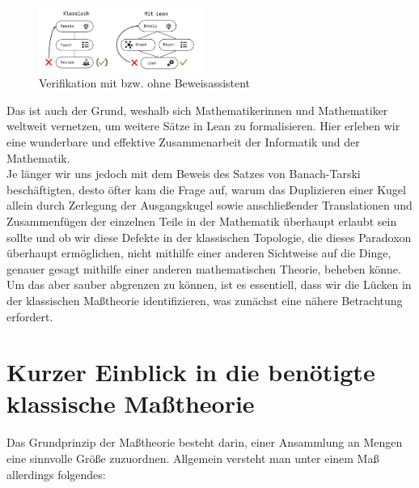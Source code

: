 \documentclass[hidelinks]{article}
\newcommand{\rot}[1]{\textcolor{red}{{#1}}}
\begin{document}
    \begin{figure}
        \begin{center}
            \includegraphics[width=0.48\textwidth]{Formalisierung_Grafik.png}
        \end{center}
        \caption{Verifikation mit bzw. ohne Beweisassistent}
        \label{Abb1}
    \end{figure}
    \noindent Das ist auch der Grund, weshalb sich Mathematikerinnen und Mathematiker weltweit vernetzen, um weitere Sätze in Lean zu formalisieren. Hier erleben wir eine wunderbare und effektive Zusammenarbeit der Informatik und der Mathematik. \\
    \noindent Je länger wir uns jedoch mit dem Beweis des Satzes von Banach-Tarski beschäftigten, desto öfter kam die Frage auf, warum das Duplizieren einer Kugel allein durch Zerlegung der Ausgangskugel sowie anschließender Translationen und Zusammenfügen der einzelnen Teile in der Mathematik überhaupt erlaubt sein sollte und ob wir diese Defekte in der klassischen Topologie, die dieses Paradoxon überhaupt ermöglichen, nicht mithilfe einer anderen Sichtweise auf die Dinge, genauer gesagt mithilfe einer anderen mathematischen Theorie, beheben könne. Um das aber sauber abgrenzen zu können, ist es essentiell, dass wir die Lücken in der klassischen Maßtheorie identifizieren, was zunächst eine nähere Betrachtung erfordert.


    \section{Kurzer Einblick in die benötigte klassische Maßtheorie}
    Das Grundprinzip der Maßtheorie besteht darin, einer Ansammlung an Mengen eine sinnvolle Größe zuzuordnen. 
    Allgemein versteht man unter einem Maß allerdings folgendes:
\end{document}
